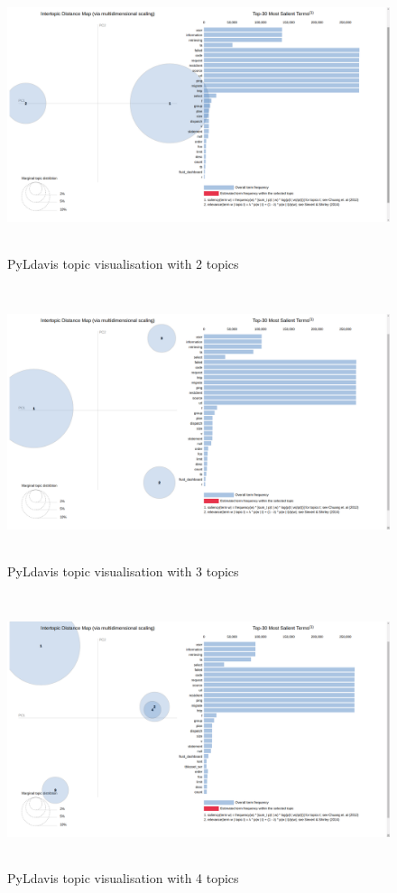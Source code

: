  \begin{figure}[!h]
    \centering
    \includegraphics[width=15cm, height=8cm,trim=0 0 100px 0, clip=true]{figures/pyldavis/pyldavis_2.png}
    \caption{PyLdavis topic visualisation with 2 topics}
    \label{fig:pyldavis_2}
\end{figure}


 \begin{figure}[!h]
    \centering
    \includegraphics[width=15cm, height=8cm,trim=0 0 100px 0, clip=true]{figures/pyldavis/pyldavis_3.png}
    \caption{PyLdavis topic visualisation with 3 topics}
    \label{fig:pyldavis_3}
\end{figure}

 \begin{figure}[!h]
    \centering
    \includegraphics[width=15cm, height=8cm,trim=0 0 100px 0, clip=true]{figures/pyldavis/pyldavis_4.png}
    \caption{PyLdavis topic visualisation with 4 topics}
    \label{fig:pyldavis_4}
\end{figure}

